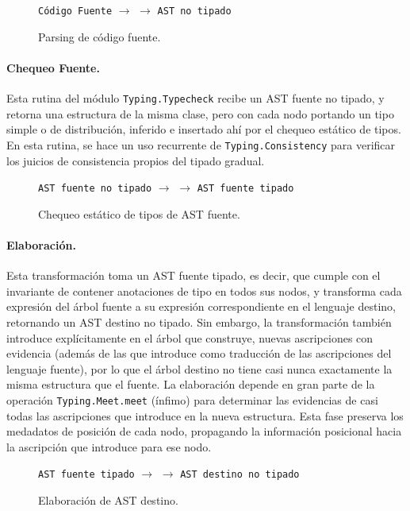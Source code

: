 \begin{figure}[h]
\centering
\texttt{Código Fuente} $\rightarrow$  $\rightarrow$ \texttt{AST no tipado}
\label{fig:arch-parsing}
\caption{Parsing de código fuente.}
\end{figure}

\paragraph{Chequeo Fuente.} Esta rutina del módulo \verb|Typing.Typecheck| recibe un AST fuente no tipado,
y retorna una estructura de la misma clase, pero con cada nodo portando un tipo simple o de distribución, inferido e insertado ahí por el chequeo estático de tipos. En esta rutina, se hace un uso recurrente  de \verb|Typing.Consistency| para verificar los juicios de consistencia propios del tipado gradual.

\begin{figure}[h]
\centering
\texttt{AST fuente no tipado} $\rightarrow$  $\rightarrow$ \texttt{AST fuente tipado}
\label{fig:arch-src-typecheck}
\caption{Chequeo estático de tipos de AST fuente.}
\end{figure}

\paragraph{Elaboración.} Esta transformación toma un AST fuente tipado, es decir, que cumple con el invariante de contener anotaciones de tipo en todos sus nodos, y transforma cada expresión del árbol fuente a su expresión correspondiente en el lenguaje destino, retornando un AST destino no tipado. Sin embargo, la transformación también introduce explícitamente en el árbol que construye, nuevas ascripciones con evidencia (además de las que introduce como traducción de las ascripciones del lenguaje fuente), por lo que el árbol destino no tiene casi nunca exactamente la misma estructura que el fuente. La elaboración depende
en gran parte de la operación \verb|Typing.Meet.meet| (ínfimo) para determinar las evidencias de casi todas las ascripciones que introduce en la nueva estructura. Esta fase preserva los medadatos de posición de cada nodo, propagando la información posicional hacia la ascripción que introduce para ese nodo.

\begin{figure}[h]
\centering
\texttt{AST fuente tipado} $\rightarrow$  $\rightarrow$ \texttt{AST destino no tipado}
\caption{Elaboración de AST destino.}
\label{fig:arch-src-typecheck}
\end{figure}


